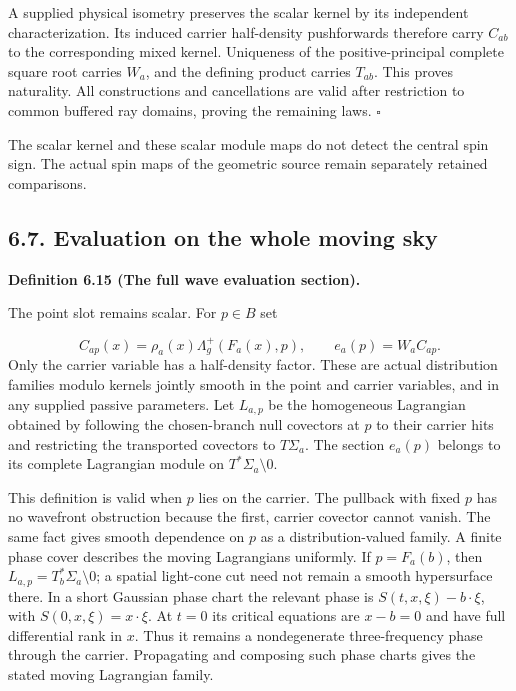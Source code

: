 \documentclass[
  english,
  11pt,
  reqno]{amsart}
\makeatletter
\newcommand{\pandocstatementheading}[1]{%
  \par\addpenalty{\@beginparpenalty}%
  \addvspace{.5\baselineskip plus .2\baselineskip minus .2\baselineskip}%
  {\normalfont\bfseries #1\par}%
  \nobreak\@afterindenttrue\@afterheading
}
\makeatother
\begin{document}
A supplied physical isometry preserves the scalar kernel by its
independent characterization. Its induced carrier half-density
pushforwards therefore carry \(C_{ab}\) to the corresponding mixed
kernel. Uniqueness of the positive-principal complete square root
carries \(W_a\), and the defining product carries \(T_{ab}\). This
proves naturality. All constructions and cancellations are valid after
restriction to common buffered ray domains, proving the remaining laws.
\hfill\(\square\)

The scalar kernel and these scalar module maps do not detect the central
spin sign. The actual spin maps of the geometric source remain
separately retained comparisons.

\subsection{6.7. Evaluation on the whole moving
sky}\label{evaluation-on-the-whole-moving-sky}\label{sec:online-complete-wave-evaluation}

\pandocstatementheading{\leavevmode{}\label{def:online-wave-evaluation-section}Definition 6.15 (The full wave evaluation section).}

The point slot remains scalar. For \(p\in B\) set

\label{eq:online-wave-complete-evaluation} \[
C_{ap}(x)=\rho_a(x)\Lambda_g^+(F_a(x),p),
\qquad e_a(p)=W_aC_{ap}.
\] Only the carrier variable has a half-density factor. These are actual
distribution families modulo kernels jointly smooth in the point and
carrier variables, and in any supplied passive parameters. Let
\(L_{a,p}\) be the homogeneous Lagrangian obtained by following the
chosen-branch null covectors at \(p\) to their carrier hits and
restricting the transported covectors to \(T\Sigma_a\). The section
\(e_a(p)\) belongs to its complete Lagrangian module on
\(T^*\Sigma_a\setminus0\).

This definition is valid when \(p\) lies on the carrier. The pullback
with fixed \(p\) has no wavefront obstruction because the first, carrier
covector cannot vanish. The same fact gives smooth dependence on \(p\)
as a distribution-valued family. A finite phase cover describes the
moving Lagrangians uniformly. If \(p=F_a(b)\), then
\(L_{a,p}=T_b^*\Sigma_a\setminus0\); a spatial light-cone cut need not
remain a smooth hypersurface there. In a short Gaussian phase chart the
relevant phase is \(S(t,x,\xi)-b\cdot\xi\), with
\(S(0,x,\xi)=x\cdot\xi\). At \(t=0\) its critical equations are
\(x-b=0\) and have full differential rank in \(x\). Thus it remains a
nondegenerate three-frequency phase through the carrier. Propagating and
composing such phase charts gives the stated moving Lagrangian family.
\end{document}
